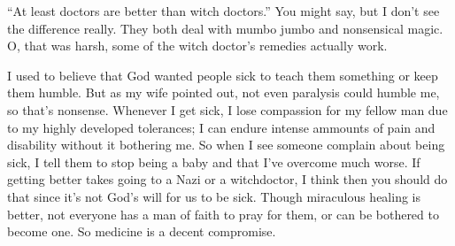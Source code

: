 ``At least doctors are better than witch doctors.'' You might say, but I don't see the difference really. They both deal with mumbo jumbo and nonsensical magic. O, that was harsh, some of the witch doctor's remedies actually work.

I used to believe that God wanted people sick to teach them something or keep them humble. But as my wife pointed out, not even paralysis could humble me, so that's nonsense. Whenever I get sick, I lose compassion for my fellow man due to my highly developed tolerances; I can endure intense ammounts of pain and disability without it bothering me. So when I see someone complain about being sick, I tell them to stop being a baby and that I've overcome much worse. If getting better takes going to a Nazi or a witchdoctor, I think then you should do that since it's not God's will for us to be sick. Though miraculous healing is better, not everyone has a man of faith to pray for them, or can be bothered to become one. So medicine is a decent compromise.
